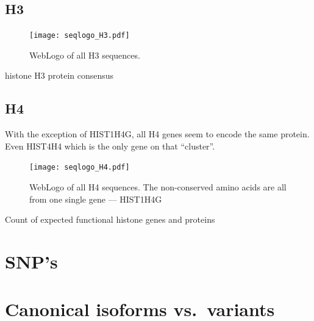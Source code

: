 \documentclass[10pt,a4paper,draft,article]{memoir}
\begin{document}
    \subsection{H3}
      \begin{figure}
        \centering
        \texttt{[image: seqlogo\_H3.pdf]}
        \caption{WebLogo of all H3 sequences.}
        \label{fig:h3-weblogo}
      \end{figure}
      \begin{table}
        \caption{histone H3 protein consensus}
        \label{tab:H3-consensus}
        \centering
        
      \end{table}

    \subsection{H4}
      With the exception of HIST1H4G, all H4 genes seem to encode the same protein. Even HIST4H4 which is the
      only gene on that ``cluster''.
      \begin{figure}
        \centering
        \texttt{[image: seqlogo\_H4.pdf]}
        \caption{WebLogo of all H4 sequences. The non-conserved amino acids are all from one single gene --- HIST1H4G}
        \label{fig:h4-weblogo}
      \end{figure}

      \begin{table}
        \caption{Count of expected functional histone genes and proteins}
        \label{tab:H4-consensus}
        \centering
        
      \end{table}

  \section{SNP's}

  \section{Canonical isoforms vs.~variants}
\end{document}
